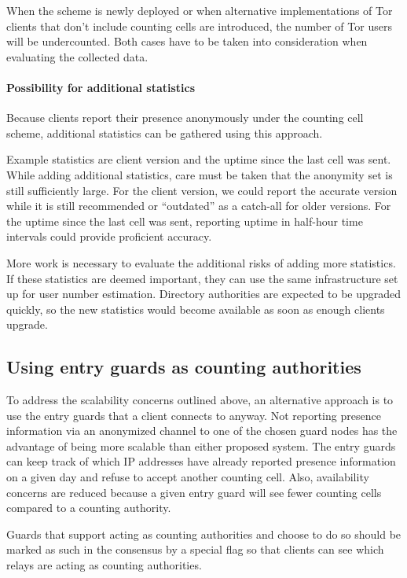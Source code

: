 \documentclass{article}
\begin{document}
When the scheme is newly deployed or when alternative
implementations of Tor clients that don't include counting cells are
introduced, the number of Tor users will be undercounted.
Both cases have to be taken into consideration when evaluating the
collected data.

\paragraph{Possibility for additional statistics}
Because clients report their presence anonymously under the counting cell scheme, additional statistics
can be gathered using this approach.

Example statistics are client version and the uptime since the last
cell was sent.
%
While adding additional statistics, care must be taken that the anonymity
set is still sufficiently large.
For the client version, we could report the accurate version while it is
still recommended or ``outdated'' as a catch-all for older versions.
%
For the uptime since the last cell was sent, reporting uptime in half-hour
time intervals could provide proficient accuracy.

More work is necessary to evaluate the additional risks of adding more
statistics.
If these statistics are deemed important, they can
use the same infrastructure set up for user number estimation.
Directory authorities are expected to be upgraded quickly, so the
new statistics would become available as soon as enough clients
upgrade.


\subsection{Using entry guards as counting authorities}
To address the scalability concerns outlined above, an alternative approach
is to use the entry guards that a client connects to anyway.
Not reporting presence information via an anonymized channel to one
of the chosen guard nodes has the advantage of being more scalable
than either proposed system.
The entry guards can keep track of which IP addresses have already
reported presence information on a given day and refuse
to accept another counting cell.
Also, availability concerns are reduced because a given entry guard
will see fewer counting cells compared to a counting authority.

Guards that support acting as counting authorities and choose to do so
should be marked as such in the consensus by a special flag
so that clients can see which relays are acting as counting authorities.
\end{document}
